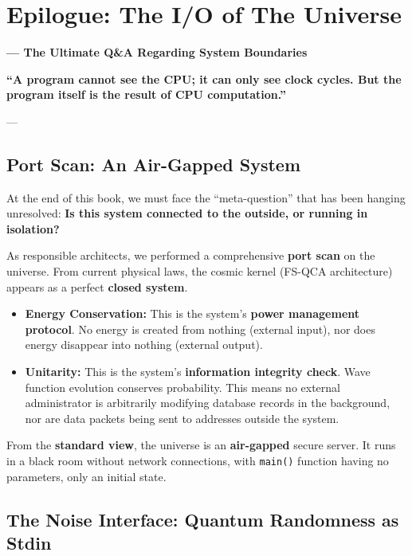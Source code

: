 \documentclass[11pt,a4paper,twoside]{book}
\begin{document}
\backmatter

\clearpage{}\chapter*{Epilogue: The I/O of The Universe}

\textbf{--- The Ultimate Q\&A Regarding System Boundaries}

\textbf{``A program cannot see the CPU; it can only see clock cycles. But the program itself is the result of CPU computation.''}

---

\section{Port Scan: An Air-Gapped System}

At the end of this book, we must face the ``meta-question'' that has been hanging unresolved: \textbf{Is this system connected to the outside, or running in isolation?}

As responsible architects, we performed a comprehensive \textbf{port scan} on the universe. From current physical laws, the cosmic kernel (FS-QCA architecture) appears as a perfect \textbf{closed system}.

\begin{itemize}
\item \textbf{Energy Conservation:} This is the system's \textbf{power management protocol}. No energy is created from nothing (external input), nor does energy disappear into nothing (external output).

\item \textbf{Unitarity:} This is the system's \textbf{information integrity check}. Wave function evolution conserves probability. This means no external administrator is arbitrarily modifying database records in the background, nor are data packets being sent to addresses outside the system.
\end{itemize}

From the \textbf{standard view}, the universe is an \textbf{air-gapped} secure server. It runs in a black room without network connections, with \texttt{main()} function having no parameters, only an initial state.

\section{The Noise Interface: Quantum Randomness as Stdin}
\end{document}
